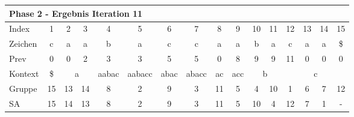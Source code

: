 \begin{table}[H]
\centering
\begin{adjustbox}{max width=\textwidth}
\centering
\begin{tabular}{lccccccccccccccc}
\multicolumn{16}{l}{Phase 2 - Ergebnis Iteration 11}                                                                                                                                                                                                                                                                                         \\ \hline
\multicolumn{1}{l|}{Index}   & 1                       & 2  & 3                       & 4                          & 5                           & 6                         & 7                          & 8                       & 9                        & 10 & 11                                             & 12  & 13  & 14  & 15  \\
\multicolumn{1}{l|}{Zeichen} & c                       & a  & a                       & b                          & a                           & c                         & c                          & a                       & a                        & b  & a                                              & c   & a   & a   & \$  \\
\multicolumn{1}{l|}{Prev}    & 0                       & 0  & 2                       & 3                          & 3                           & 5                         & 5                          & 0                       & 8                        & 9  & 9                                              & 11  & 0   & 0   & 0   \\ \hline
\multicolumn{1}{l|}{Kontext} & \multicolumn{1}{c|}{\$} & \multicolumn{2}{c|}{a}       & \multicolumn{1}{c|}{aabac} & \multicolumn{1}{c|}{aabacc} & \multicolumn{1}{c|}{abac} & \multicolumn{1}{c|}{abacc} & \multicolumn{1}{c|}{ac} & \multicolumn{1}{c|}{acc} & \multicolumn{2}{c|}{b}                              & \multicolumn{4}{c}{c} \\
\multicolumn{1}{l|}{Gruppe}  & \multicolumn{1}{c|}{15} & 13 & \multicolumn{1}{c|}{14} & \multicolumn{1}{c|}{8}     & \multicolumn{1}{c|}{2}      & \multicolumn{1}{c|}{9}    & \multicolumn{1}{c|}{3}     & \multicolumn{1}{c|}{11} & \multicolumn{1}{c|}{5}   & 4  & \multicolumn{1}{c|}{10}                        & 1   & 6   & 7   & 12  \\
\multicolumn{1}{l|}{SA}      & \multicolumn{1}{c|}{15} & 14 & \multicolumn{1}{c|}{13} & \multicolumn{1}{c|}{8}     & \multicolumn{1}{c|}{2}      & \multicolumn{1}{c|}{9}    & \multicolumn{1}{c|}{3}     & \multicolumn{1}{c|}{11} & \multicolumn{1}{c|}{5}   & 10 & \multicolumn{1}{c|}{\cellcolor[HTML]{\green}4} & 12  & 7   & 1   & -  
\end{tabular}
\end{adjustbox}


\end{table}
